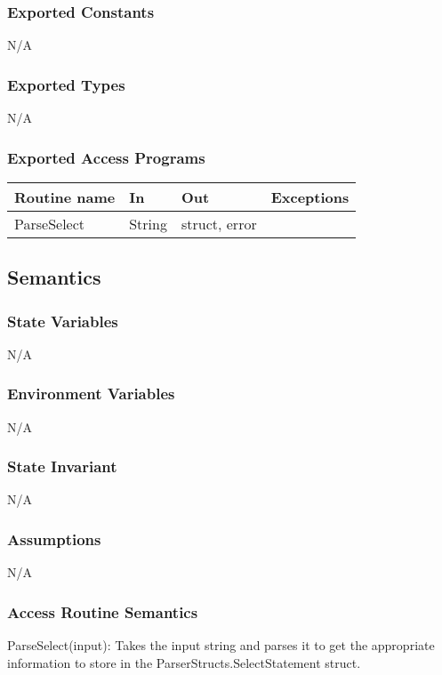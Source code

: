 \documentclass[12pt]{article}
\begin{document}
\subsubsection {Exported Constants}
N/A
\subsubsection {Exported Types}
N/A

\subsubsection {Exported Access Programs}

\begin{tabular}{| l | l | l | l |}
\hline
\textbf{Routine name} & \textbf{In} & \textbf{Out} & \textbf{Exceptions}\\
\hline
{\color{red}ParseSelect} & {\color{red}String} & {\color{red}struct, error} & \\
\hline
\end{tabular}

\subsection{Semantics}
\subsubsection{State Variables}
N/A

\subsubsection{Environment Variables}
N/A

\subsubsection{State Invariant}
N/A

\subsubsection{Assumptions}
N/A

\subsubsection{Access Routine Semantics}
{\color{red} \noindent ParseSelect(input): Takes the input string and parses it to get the appropriate information to store in the ParserStructs.SelectStatement struct.\\}
\end{document}
